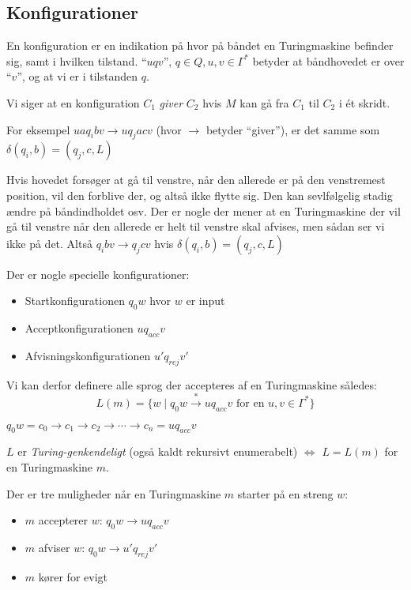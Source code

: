 \subsection{Konfigurationer}%
\label{subsec:label}


En konfiguration er en indikation på hvor på båndet en Turingmaskine befinder sig, samt i hvilken tilstand. ``$uqv$'', $q \in Q, u, v \in \Gamma^{*}$ betyder at båndhovedet er over ``$v$'', og at vi er i tilstanden $q$.

Vi siger at en konfiguration $C_{1}$ \textit{giver} $C_{2}$ hvis $M$ kan gå fra $C_{1}$ til $C_{2}$ i ét skridt.

For eksempel $uaq_{i}bv \rightarrow uq_{j}acv$ (hvor \(\rightarrow\) betyder ``giver''), er det samme som $\delta(q_{i},b) = (q_{j}, c, L)$

Hvis hovedet forsøger at gå til venstre, når den allerede er på den venstremest position, vil den forblive der, og altså ikke flytte sig. Den kan sevlfølgelig stadig ændre på båndindholdet osv. Der er nogle der mener at en Turingmaskine der vil gå til venstre når den allerede er helt til venstre skal afvises, men sådan ser vi ikke på det. Altså $q_{i}bv \rightarrow q_{j}cv$ hvis $\delta(q_{i},b) = (q_{j}, c, L)$

Der er nogle specielle konfigurationer:

\begin{itemize}
	\item Startkonfigurationen $q_{0}w$ hvor $w$ er input
	\item Acceptkonfigurationen $uq_{acc}v$
	\item Afvisningskonfigurationen $u'q_{rej}v'$
\end{itemize}

Vi kan derfor definere alle sprog der accepteres af en Turingmaskine således:
\begin{equation}
	L(m) = \{w \mid q_{0}w \stackrel{*}{\longrightarrow} uq_{acc}v \text{ for en }u,v \in \Gamma^{*}\}
\end{equation}

$q_{0}w = c_{0} \rightarrow c_{1} \rightarrow c_{2} \rightarrow \cdots \rightarrow c_{n} = uq_{acc}v$

\begin{definition}
	$L$ er \textit{Turing-genkendeligt} (også kaldt rekursivt enumerabelt) $\iff$ $L = L(m)$ for en Turingmaskine $m$.
\end{definition}

Der er tre muligheder når en Turingmaskine $m$ starter på en streng $w$:
\begin{itemize}
	\item $m$ accepterer $w$: $q_{0}w \rightarrow uq_{acc}v$
	\item $m$ afviser $w$: $q_{0}w \rightarrow u'q_{rej}v'$
	\item $m$ kører for evigt
\end{itemize}

